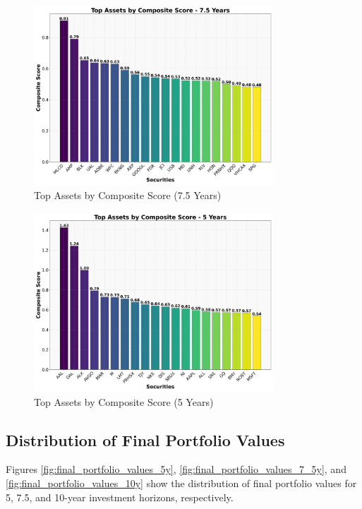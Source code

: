 \begin{figure}[!htbp]
    \centering
    \includegraphics[width=0.8\textwidth]{../Figures/top_assets_composite_score_7_5_years.png}
    \caption{Top Assets by Composite Score (7.5 Years)}
    \label{fig:top_assets_7_5y}
\end{figure}

\begin{figure}[!htbp]
    \centering
    \includegraphics[width=0.8\textwidth]{../Figures/top_assets_composite_score_5_years.png}
    \caption{Top Assets by Composite Score (5 Years)}
    \label{fig:top_assets_5y}
\end{figure}

\subsection{Distribution of Final Portfolio Values}
Figures \ref{fig:final_portfolio_values_5y}, \ref{fig:final_portfolio_values_7_5y}, and \ref{fig:final_portfolio_values_10y} show the distribution of final portfolio values for 5, 7.5, and 10-year investment horizons, respectively.

